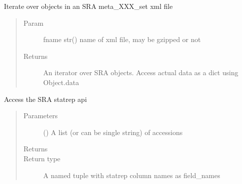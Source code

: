 \documentclass[letterpaper,10pt,english]{sphinxmanual}
\begin{document}

\begin{fulllineitems}
\label{\detokenize{omicidx.sra_parsers:omicidx.sra_parsers.sra_object_generator}}
Iterate over objects in an SRA meta\_XXX\_set xml file
\begin{quote}\begin{description}
\item[{Param}] \leavevmode
fname str() name of xml file, may be gzipped or not

\item[{Returns}] \leavevmode
An iterator over SRA objects. Access actual data
as a dict using Object.data

\end{description}\end{quote}

\end{fulllineitems}


\begin{fulllineitems}
\label{\detokenize{omicidx.sra_parsers:omicidx.sra_parsers.srastatrep}}
Access the SRA statrep api
\begin{quote}\begin{description}
\item[{Parameters}] \leavevmode
{} (\sphinxstyleliteralemphasis{\sphinxupquote{{[}}}\sphinxstyleliteralemphasis{\sphinxupquote{{]}}}) \textendash{} A list (or can be single string) of accessions

\item[{Returns}] \leavevmode


\item[{Return type}] \leavevmode
A named tuple with statrep column names as field\_names

\end{description}\end{quote}

\end{fulllineitems}
\end{document}

